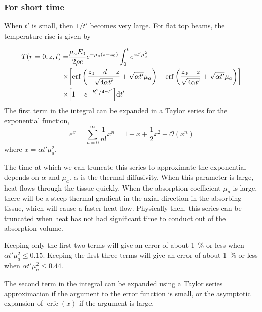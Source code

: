 \documentclass[]{article}
\DeclareMathOperator\erfc{erfc}
\begin{document}
\subsubsection{For short time}


When $t'$ is small, then $1/t'$ becomes very large. For flat top beams, the temperature rise is given by

\begin{align*}
	T(r=0, z,t) =& \frac{\mu_aE_0}{2\rho c}e^{-\mu_a (z-z_0)} \int_0^t e^{\alpha t'\mu_a^2}  \nonumber \\
	\times & \qty[\erf\qty(\frac{z_0 + d - z}{\sqrt{4\alpha t'}} + \sqrt{\alpha t'}\mu_a ) - \erf\qty(\frac{z_0 - z}{\sqrt{4\alpha t'}} + \sqrt{\alpha t'}\mu_a ) ]  \\
	\times & \qty[1 - e^{-R^2/4\alpha t'} ]
	\dd t'
\end{align*}
The first term in the integral can be expanded in a Taylor series for the exponential function,
\begin{equation}
	e^x = \sum_{n=0}^{\infty} \frac{1}{n!} x^n = 1 + x + \frac{1}{2} x^2 + \mathcal{O}(x^n)
\end{equation}
where $x = \alpha t' \mu_a^2$.

The time at which we can truncate this series to approximate the exponential depends on $\alpha$ and $\mu_a$. $\alpha$ is the thermal diffusivity. When this parameter is large, heat
flows through the tissue quickly. When the absorption coefficient $\mu_a$ is large, there will be a steep thermal gradient in the axial direction in the absorbing tissue, which will cause
a faster heat flow. Physically then, this series can be truncated when heat has not had significant time to conduct out of the absorption volume.

Keeping only the first two terms will give an error of about \SI{1}{\percent} or less when $\alpha t' \mu_a^2 \le 0.15$. Keeping the first three terms will give an error of about \SI{1}{\percent} or less when
$\alpha t' \mu_a^2 \le 0.44$.

The second term in the integral can be expanded using a Taylor series approximation if the argument to the error function is small, or the asymptotic expansion of $\erfc(x)$ if the argument is large.
\end{document}
